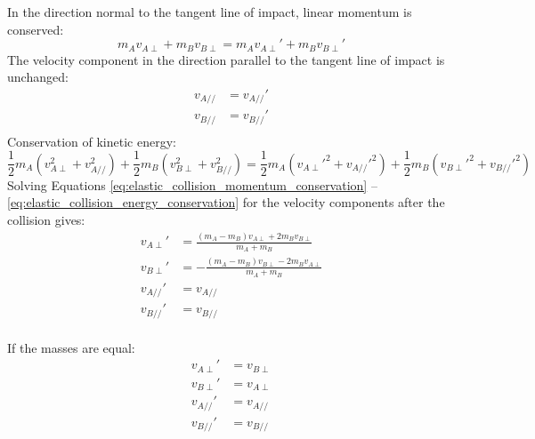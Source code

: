\documentclass{article}
\begin{document}
In the direction normal to the tangent line of impact, linear momentum is conserved:
\begin{equation}
\label{eq:elastic_collision_momentum_conservation}
m_Av_{A\perp} + m_Bv_{B\perp} = m_Av_{A\perp}' + m_Bv_{B\perp}'
\end{equation}
The velocity component in the direction parallel to the tangent line of impact is unchanged:
\begin{equation}
\begin{split}
v_{A//} &= v_{A//}'\\
v_{B//} &= v_{B//}'\\
\end{split}
\end{equation}
Conservation of kinetic energy:
\begin{equation}
\label{eq:elastic_collision_energy_conservation}
\frac{1}{2}m_A(v_{A\perp}^2+v_{A//}^2) + \frac{1}{2}m_B(v_{B\perp}^2+v_{B//}^2) = \frac{1}{2}m_A(v_{A\perp}'^2+v_{A//}'^2) + \frac{1}{2}m_B(v_{B\perp}'^2+v_{B//}'^2)
\end{equation}
Solving Equations \ref{eq:elastic_collision_momentum_conservation} -- \ref{eq:elastic_collision_energy_conservation} for the velocity components after the collision gives:
\begin{equation}
\begin{split}
v_{A\perp}' &= \frac{(m_A - m_B)v_{A\perp} + 2m_Bv_{B\perp}}{m_A+m_B}\\
v_{B\perp}' &= -\frac{(m_A - m_B)v_{B\perp} - 2m_Bv_{A\perp}}{m_A+m_B}\\
v_{A//}' &= v_{A//}\\
v_{B//}' &= v_{B//}\\
\end{split}
\end{equation}

If the masses are equal:
\begin{equation}
\begin{split}
v_{A\perp}' &= v_{B\perp}\\
v_{B\perp}' &= v_{A\perp}\\
v_{A//}' &= v_{A//}\\
v_{B//}' &= v_{B//}\\
\end{split}
\end{equation}
\end{document}
